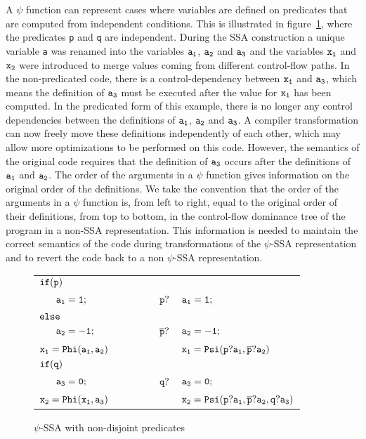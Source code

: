 A $\psi$ function can represent cases where variables are defined on
predicates that are computed from independent conditions. This is
illustrated in figure~\ref{fig:non_disjoint_pred}, where the
predicates {\tt p} and {\tt q} are independent. During the SSA
construction a unique variable {\tt a} was renamed into the variables
${\tt a_1}$, ${\tt a_2}$ and ${\tt a_3}$ and the variables ${\tt x_1}$
and ${\tt x_2}$ were introduced to merge values coming from different
control-flow paths. In the non-predicated code, there is a
control-dependency between ${\tt x_1}$ and ${\tt a_3}$, which means
the definition of ${\tt a_3}$ must be executed after the value for
${\tt x_1}$ has been computed. In the predicated form of this example,
there is no longer any control dependencies between the definitions of
${\tt a_1}$, ${\tt a_2}$ and ${\tt a_3}$. A compiler transformation
can now freely move these definitions independently of each other,
which may allow more optimizations to be performed on this
code. However, the semantics of the original code requires that the
definition of ${\tt a_3}$ occurs after the definitions of ${\tt a_1}$
and ${\tt a_2}$. The order of the arguments in a $\psi$ function gives
information on the original order of the definitions. We take the
convention that the order of the arguments in a $\psi$ function is,
from left to right, equal to the original order of their definitions,
from top to bottom, in the control-flow dominance tree of the program
in a non-SSA representation. This information is needed to maintain
the correct semantics of the code during transformations of the
$\psi$-SSA representation and to revert the code back to a non
$\psi$-SSA representation.


\begin{figure}
\begin{center}
\footnotesize
\begin{tabular}{llll}
${\tt if (p)}$        & & & \\
${\tt\ \ \ \ \ a_1 = 1;}$ & \ \ \ \ \  & ${\tt p?}$ & ${\tt a_1 = 1;}$ \\
${\tt else}$          & & & \\
${\tt\ \ \ \ \     a_2 = -1;}$ & \ \ \ \ \  & ${\tt \overline{p}?}$ & ${\tt a_2 = -1;}$ \\
${\tt x_1 = Phi(a_1, a_2)}$ & & & ${\tt x_1 = Psi(p?a_1, \overline{p}?a_2)}$ \\
${\tt if (q)}$        & & & \\
${\tt\ \ \ \ \ a_3 = 0;}$ & \ \ \ \ \  & ${\tt q?}$ & ${\tt a_3 = 0;}$ \\
${\tt x_2 = Phi(x_1, a_3)}$ & & & ${\tt x_2 = Psi(p?a_1, \overline{p}?a_2, q?a_3)}$ \\
\end{tabular}
\caption{$\psi$-SSA with non-disjoint predicates}
\label{fig:non_disjoint_pred}
\end{center}
\end{figure}


